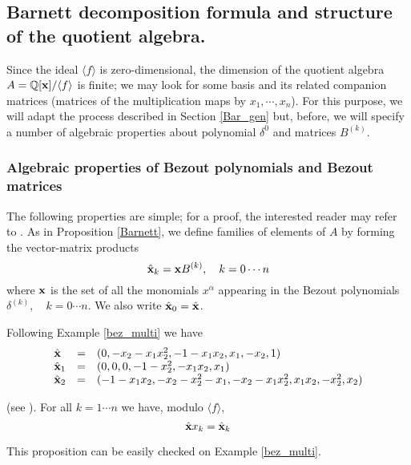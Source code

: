\documentclass{standalone}
\begin{document}
\subsection{Barnett decomposition formula and structure of the quotient algebra.}
Since the ideal $\langle f\rangle$ is zero-dimensional, the dimension of the quotient algebra $A = \mathbb{Q}[\bold{x}]/\langle f\rangle$ is finite; we may look for some basis and its related companion matrices (matrices of the multiplication maps by $x_1,\cdots, x_n$). 
For this purpose, we will adapt the process described in Section \ref{Bar_gen} but, before, we will specify a number of algebraic properties about polynomial $\delta^0$ and matrices $B^{(k)}$.

\subsubsection{Algebraic properties of Bezout polynomials and Bezout matrices}
The following properties are simple; for a proof, the interested reader may refer to \cite{jpc}. As in Proposition \ref{Barnett}, we define families of elements of $A$ by forming the vector-matrix products
\begin{equation}
		\hat{\bold{x}}_k  =  \bold{x}B^{(k)}, \quad k=0\cdots n
\end{equation}
where $\bold{x}$ is the set of all the monomials $x^\alpha$ appearing in the Bezout polynomials $\delta^{(k)}, \quad k=0\cdots n$. We also write $\hat{\bold{x}}_0 = \hat{\bold{x}}$.
\begin{exmp}
Following Example \ref{bez_multi} we have
\begin{equation}
	\begin{array}{lll}
		\hat{\bold{x}} & = & (0, -x_2 - x_1x_2^2, -1 - x_1x_2, x_1, -x_2, 1) \\
		\hat{\bold{x}}_1 & = & (0, 0, 0, -1 - x_2^2, -x_1x_2, x_1) \\
		\hat{\bold{x}}_2 & = & (-1 - x_1x_2, -x_2 - x_2^2 - x_1, - x_2 - x_1x_2^2, x_1x_2, -x_2^2, x_2)
	\end{array}
\end{equation}
\end{exmp}

\begin{prop}
\label{xj} (see \cite{jpc}).
For all $k=1\cdots n$ we have, modulo $\langle f \rangle$,
\begin{equation}
    \hat{\bold{x}}x_k = \hat{\bold{x}}_k
\end{equation}
\end{prop}
This proposition can be easily checked on Example \ref{bez_multi}. 
\end{document}
